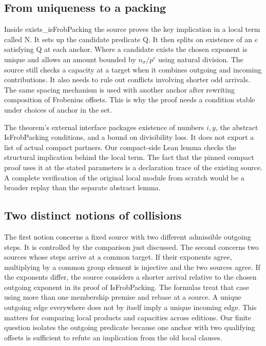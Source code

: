 \documentclass[12pt,letterpaper]{article}
\DeclareRobustCommand{\id}[1]{\mbox{\small\ttfamily #1}}
\begin{document}
\subsection{From uniqueness to a packing}

Inside \id{exists\_isFrobPacking} the source proves the key implication in a local term called \id{N}. It sets up the candidate predicate \id{Q}. It then splits on existence of an $e$ satisfying \id{Q} at each anchor. Where a candidate exists the chosen exponent is unique and allows an amount bounded by \(n_\sigma/p^e\) using natural division. The source still checks a capacity at a target when it combines outgoing and incoming contributions. It also needs to rule out conflicts involving shorter odd arrivals. The same spacing mechanism is used with another anchor after rewriting composition of Frobenius offsets. This is why the proof needs a condition stable under choices of anchor in the set.

The theorem's external interface packages existence of numbers \(i,y\), the abstract \id{IsFrobPacking} conditions, and a bound on divisibility loss. It does not export a list of actual compact partners. Our compact-side Lean lemma checks the structural implication behind the local term. The fact that the pinned compact proof uses it at the stated parameters is a declaration trace of the existing source. A complete verification of the original local module from scratch would be a broader replay than the separate abstract lemma.

\subsection{Two distinct notions of collisions}

The first notion concerns a fixed source with two different admissible outgoing steps. It is controlled by the comparison just discussed. The second concerns two sources whose steps arrive at a common target. If their exponents agree, multiplying by a common group element is injective and the two sources agree. If the exponents differ, the source considers a shorter arrival relative to the chosen outgoing exponent in its proof of \id{IsFrobPacking}. The formulas treat that case using more than one membership premise and rebase at a source. A unique outgoing edge everywhere does not by itself imply a unique incoming edge. This matters for comparing local products and capacities across editions. Our finite question isolates the outgoing predicate because one anchor with two qualifying offsets is sufficient to refute an implication from the old local clauses.
\end{document}
